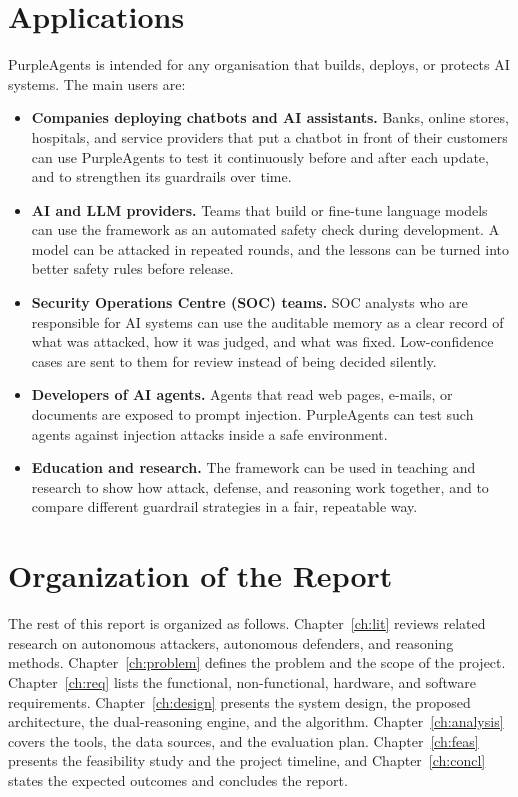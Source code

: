 \section{Applications}

PurpleAgents is intended for any organisation that builds, deploys, or protects
AI systems. The main users are:

\begin{itemize}
  \item \textbf{Companies deploying chatbots and AI assistants.} Banks, online
  stores, hospitals, and service providers that put a chatbot in front of their
  customers can use PurpleAgents to test it continuously before and after each
  update, and to strengthen its guardrails over time.

  \item \textbf{AI and LLM providers.} Teams that build or fine-tune language
  models can use the framework as an automated safety check during development. A
  model can be attacked in repeated rounds, and the lessons can be turned into
  better safety rules before release.

  \item \textbf{Security Operations Centre (SOC) teams.} SOC analysts who are
  responsible for AI systems can use the auditable memory as a clear record of
  what was attacked, how it was judged, and what was fixed. Low-confidence cases
  are sent to them for review instead of being decided silently.

  \item \textbf{Developers of AI agents.} Agents that read web pages, e-mails,
  or documents are exposed to prompt injection. PurpleAgents can test such agents
  against injection attacks inside a safe environment.

  \item \textbf{Education and research.} The framework can be used in teaching
  and research to show how attack, defense, and reasoning work together, and to
  compare different guardrail strategies in a fair, repeatable way.
\end{itemize}

\section{Organization of the Report}

The rest of this report is organized as follows. Chapter~\ref{ch:lit} reviews
related research on autonomous attackers, autonomous defenders, and reasoning
methods. Chapter~\ref{ch:problem} defines the problem and the scope of the
project. Chapter~\ref{ch:req} lists the functional, non-functional, hardware, and
software requirements. Chapter~\ref{ch:design} presents the system design, the
proposed architecture, the dual-reasoning engine, and the algorithm.
Chapter~\ref{ch:analysis} covers the tools, the data sources, and the evaluation
plan. Chapter~\ref{ch:feas} presents the feasibility study and the project timeline,
and Chapter~\ref{ch:concl} states the expected outcomes and concludes the report.
